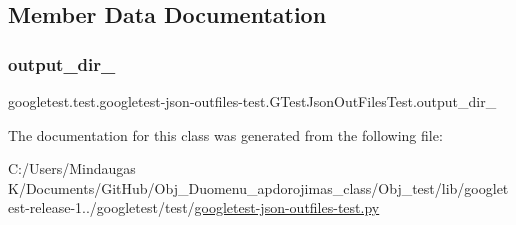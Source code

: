 \subsection{Member Data Documentation}
\mbox{\label{classgoogletest_1_1test_1_1googletest-json-outfiles-test_1_1_g_test_json_out_files_test_a450ec2208d7e83e2a19d5dac06b54a95}} 
\subsubsection{\texorpdfstring{output\_dir\_}{output\_dir\_}}
{\footnotesize\ttfamily googletest.\+test.\+googletest-\/json-\/outfiles-\/test.\+G\+Test\+Json\+Out\+Files\+Test.\+output\+\_\+dir\+\_\+}



The documentation for this class was generated from the following file\+:\begin{DoxyCompactItemize}
\item 
C\+:/\+Users/\+Mindaugas K/\+Documents/\+Git\+Hub/\+Obj\+\_\+\+Duomenu\+\_\+apdorojimas\+\_\+class/\+Obj\+\_\+test/lib/googletest-\/release-\/1../googletest/test/\mbox{\hyperlink{_obj__test_2lib_2googletest-release-1_88_81_2googletest_2test_2googletest-json-outfiles-test_8py}{googletest-\/json-\/outfiles-\/test.\+py}}\end{DoxyCompactItemize}
